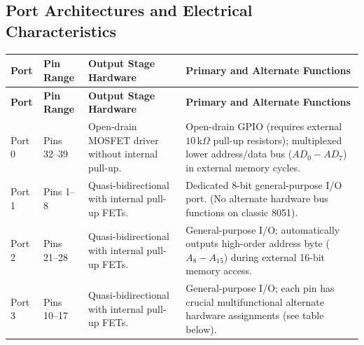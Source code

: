 \documentclass[12pt,a4paper]{article}
\begin{document}
\subsection{Port Architectures and Electrical Characteristics}
\par\vspace{6pt}\noindent
\begingroup
\setlength{\extrarowheight}{2.5pt}
\begingroup
\setlength{\LTleft}{0pt}
\setlength{\LTright}{0pt}
\begin{longtable}{|B{1.6cm}|B{2.2cm}|B{3.65cm}|>{\small\raggedright\arraybackslash}m{\dimexpr(\linewidth-1.6cm-2.2cm-3.65cm-8\arrayrulewidth)/1\relax}|}
\hline
\textbf{Port} & \textbf{Pin Range} & \textbf{Output Stage Hardware} & \textbf{Primary and Alternate Functions} \\ \hline
\endfirsthead
\hline
\textbf{Port} & \textbf{Pin Range} & \textbf{Output Stage Hardware} & \textbf{Primary and Alternate Functions} \\ \hline
\endhead
Port 0 & Pins 32--39 & Open-drain MOSFET driver without internal pull-up. & Open-drain GPIO (requires external $10\,\mathrm{k}\Omega$ pull-up resistors); multiplexed lower address/data bus ($AD_0-AD_7$) in external memory cycles. \\ \hline
Port 1 & Pins 1--8 & Quasi-bidirectional with internal pull-up FETs. & Dedicated 8-bit general-purpose I/O port. (No alternate hardware bus functions on classic 8051). \\ \hline
Port 2 & Pins 21--28 & Quasi-bidirectional with internal pull-up FETs. & General-purpose I/O; automatically outputs high-order address byte ($A_8-A_{15}$) during external 16-bit memory access. \\ \hline
Port 3 & Pins 10--17 & Quasi-bidirectional with internal pull-up FETs. & General-purpose I/O; each pin has crucial multifunctional alternate hardware assignments (see table below). \\ \hline
\end{longtable}
\endgroup\par
\endgroup
\end{document}
